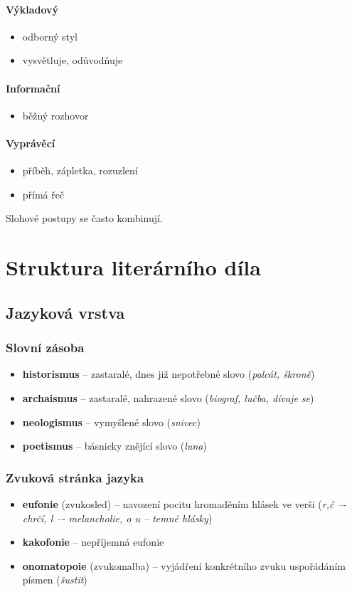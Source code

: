 \paragraph{Výkladový}
\begin{itemize}
\item odborný styl
\item vysvětluje, odůvodňuje
\end{itemize}

\paragraph{Informační}
\begin{itemize}
\item běžný rozhovor
\end{itemize}

\paragraph{Vyprávěcí}
\begin{itemize}
\item příběh, zápletka, rozuzlení
\item přímá řeč
\end{itemize}
Slohové postupy se často kombinují.

\newpage
\section{Struktura literárního díla}
\subsection{Jazyková vrstva}
\subsubsection{Slovní zásoba}
\begin{itemize}
\item[] \textbf{historismus} -- zastaralé, dnes již nepotřebné slovo (\textit{palcát, škroně})
\item[] \textbf{archaismus} -- zastaralé, nahrazené slovo (\textit{biograf, lučba, dívaje se})
\item[] \textbf{neologismus} -- vymyšlené slovo (\textit{snivec})
\item[] \textbf{poetismus} -- básnicky znějící slovo (\textit{luna})
\end{itemize}

\subsubsection{Zvuková stránka jazyka}
\begin{itemize}
\item[] \textbf{eufonie} (zvukosled) -- navození pocitu hromaděním hlásek ve verši (\textit{r,č –- chrčí, l –- melancholie, o u -- temné hlásky})
\item[] \textbf{kakofonie} -- nepříjemná eufonie
\item[] \textbf{onomatopoie} (zvukomalba) -- vyjádření konkrétního zvuku uspořádáním písmen (\textit{šustit})
\end{itemize}

